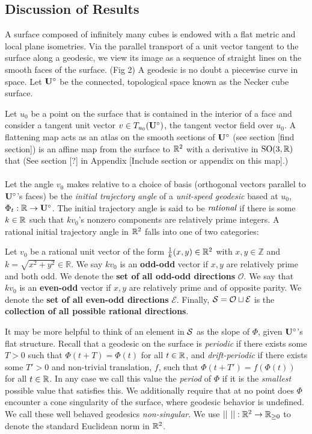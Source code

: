 \documentclass[a4paper, 11pt]{article}
\def\SO{\mathrm{SO}}
\begin{document}
\subsection{Discussion of Results}
A surface composed of infinitely many cubes is endowed with a flat metric and local plane isometries. Via the parallel transport of a unit vector tangent to the surface along a geodesic, we view its image as a sequence of straight lines on the smooth faces of the surface. (Fig 2) A geodesic is no doubt a piecewise curve in space. Let $\mathbf{U}^\circ$ be the connected, topological space known as the Necker cube surface.
\\\newpage
\begin{figure}

\end{figure}
\noindent Let $u_0$ be a point on the surface that is contained in the interior of a face and consider a tangent unit vector $v\in T_{u_0}(\mathbf{U}^\circ)$, the tangent vector field over $u_0$. A flattening map acts as an atlas on the smooth sections of $\mathbf{U}^\circ$ (see section [find section]) is an affine map from the surface to $\mathbb{R}^2$ with a derivative in $\SO(3,\RR)$ that   (See section [?] in Appendix [Include section or appendix on this map].)
\\\\
Let the angle $v_0$ makes relative to a choice of basis (orthogonal vectors parallel to $\mathbf{U}^\circ$'s faces) be the \emph{initial trajectory angle} of a \emph{unit-speed geodesic} based at $u_0$, $\Phi_t:\mathbb{R}\rightarrow\mathbf{U}^\circ$. The initial trajectory angle is said to be $\emph{rational}$ if there is some $k\in\mathbb{R}$ such that $kv_0$'s nonzero components are relatively prime integers. A rational initial trajectory angle in $\mathbb{R}^2$ falls into one of two categories:
\begin{Def}
Let $v_0$ be a rational unit vector of the form $\frac{1}{k}(x,y)\in\mathbb{R}^2$ with $x,y\in\mathbb{Z}$ and $k=\sqrt{x^2+y^2}\in\mathbb{R}$. We say $kv_0$ is an \textbf{odd-odd} vector if $x,y$ are relatively prime and both odd. We denote the \textbf{set of all odd-odd directions} $\mathcal{O}$. We say that $kv_0$ is an \textbf{even-odd} vector if $x,y$ are relatively prime and of opposite parity. We denote the \textbf{set of all even-odd directions} $\mathcal{E}$. Finally, $\mathcal{S}=\mathcal{O}\sqcup\mathcal{E}$ is the \textbf{collection of all possible rational directions}.
\end{Def}
\noindent It may be more helpful to think of an element in $\mathcal{S}$ as the slope of $\Phi$, given $\mathbf{U}^\circ$'s flat structure. Recall that a geodesic on the surface is \emph{periodic} if there exists some $T>0$ such that $\Phi(t+T)=\Phi(t)$ for all $t\in\mathbb{R}$, and \emph{drift-periodic} if there exists some $T'>0$ and non-trivial translation, $f$, such that $\Phi(t+T')=f(\Phi(t))$ for all $t\in\mathbb{R}$. In any case we call this value the \emph{period} of $\Phi$ if it is the \emph{smallest} possible value that satisfies this. We additionally require that at no point does $\Phi$ encounter a cone singularity of the surface, where geodesic behavior is undefined. We call these well behaved geodesics \emph{non-singular}. We use $||~||:\mathbb{R}^2\rightarrow\mathbb{R}_{\geq 0}$ to denote the standard Euclidean norm in $\mathbb{R}^2$.
\end{document}
